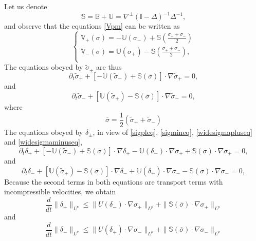 \documentclass[11pt,reqno]{amsproc}
\newcommand{\pa}{\partial}
\newcommand{\la}{\label}
\newcommand{\fr}{\frac}
\newcommand{\na}{\nabla}
\newcommand{\be}{\begin{equation}}
\newcommand{\ee}{\end{equation}}
\newcommand{\ba}{\begin{array}{l}}
\newcommand{\ea}{\end{array}}
\newcommand{\ov}{\overline}
\begin{document}
Let us denote 
\be
\mathbb S = \mathbb B + \mathbb U = \na^{\perp} (\mathbb I -\Delta)^{-1}\Delta^{-1},
\la{mathbbS}
\ee
and observe that the equations \eqref{Vpm}
can be written as
\be
\left \{
\ba
\mathbb V_{+} (\sigma) = - \mathbb U(\sigma_-) + \mathbb S\left(\fr{\sigma_+ + \sigma_-}{2}\right)\\
\mathbb V_-(\sigma) =   \mathbb U(\sigma_+) - \mathbb S\left(\fr{\sigma_+ + \sigma_-}{2}\right),\\
\ea
\right .
\la{VpmS}
\ee
The equations obeyed by $\widetilde\sigma_{\pm}$ are thus
\be
\pa_t\widetilde\sigma_+ + \left[- \mathbb U(\widetilde\sigma_-) + \mathbb S(\ov\sigma)\right ]\cdot\na\widetilde\sigma_+ =0,
\la{widesigmapluseq}
\ee
and
\be
\pa_t\widetilde\sigma_- + \left[ \mathbb U(\widetilde\sigma_+) - \mathbb S(\ov\sigma)\right ]\cdot\na\widetilde\sigma_- =0,
\la{widesigmaminuseq}
\ee
where 
\be
\ov\sigma = \fr{1}{2}(\widetilde\sigma_+ + \widetilde\sigma_-)
\la{ovsigma}
\ee
The equations obeyed by $\delta_{\pm}$, in view of \eqref{sigpleq}, \eqref{sigmineq}, 
\eqref{widesigmapluseq} and \eqref{widesigmaminuseq},
\be
\pa_t \delta_+  + \left[- \mathbb U(\widetilde\sigma_-) + \mathbb S(\ov\sigma)\right ]\cdot\na \delta_+
   -\mathbb U(\delta_-)\cdot\na\sigma_+ + \mathbb S(\ov\sigma)\cdot\na\sigma_+ = 0,
\la{deltapluseq}
\ee
and
\be
\pa_t \delta_-  + \left[ \mathbb U(\widetilde\sigma_+) - \mathbb S(\ov\sigma)\right ]\cdot\na\delta_- + \mathbb U(\delta_+)\cdot\na\sigma_- - \mathbb S(\ov\sigma)\cdot\na\sigma_- = 0,
\la{deltaminuseq}
\ee
Because the second terms in both equations are transport terms with incompressible velocities, we obtain
\be
\fr{d}{dt}\|\delta_+\|_{L^p} \le \|U(\delta_-)\cdot\na\sigma_+\|_{L^p} + \|\mathbb S(\ov\sigma)\cdot\na\sigma_+\|_{L^p}
\la{deltpluslp}
\ee
and 
\be
\fr{d}{dt}\|\delta_-\|_{L^p} \le \|U(\delta_+)\cdot\na\sigma_-\|_{L^p} + \|\mathbb S(\ov\sigma)\cdot\na\sigma_-\|_{L^p}
\la{deltminlp}
\ee
\end{document}
